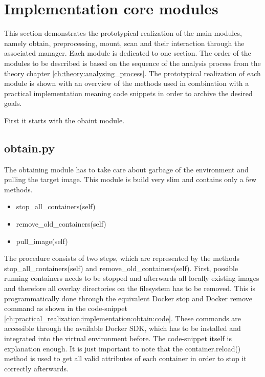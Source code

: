 \section{Implementation core modules}
\label{ch:practical_realization:implementation}
This section demonstrates the prototypical realization of the main modules, namely obtain, preprocessing, mount, scan and their interaction through the associated manager. Each module is dedicated to one section. The order of the modules to be described is based on the sequence of the analysis process from the theory chapter \ref{ch:theory:analysing_process}.
The prototypical realization of each module is shown with an overview of the methods used in combination with a practical implementation meaning code snippets in order to archive the desired goals. 

First it starts with the obaint module.

\subsection{obtain.py}
\label{ch:practical_realization:implementation:obtain}
The obtaining module has to take care about garbage of the environment and pulling the target image.
This module is build very slim and contains only a few methods.
\begin{itemize}
\item stop\_all\_containers(self)
\item remove\_old\_containers(self)
\item pull\_image(self)
\end{itemize}
The procedure consists of two steps, which are represented by the methods stop\_all\_containers(self) and remove\_old\_containers(self). First, possible running containers needs to be stopped and afterwards all locally existing images and therefore all overlay directories on the filesystem has to be removed. This is programmatically done through the equivalent Docker stop and Docker remove command as shown in the code-snippet \ref{ch:practical_realization:implementation:obtain:code}. These commands are accessible through the available Docker SDK, which has to be installed and integrated into the virtual environment before. 
The code-snippet itself is explanation enough. It is just important to note that the container.reload() method is used to get all valid attributes of each container in order to stop it correctly afterwards.

